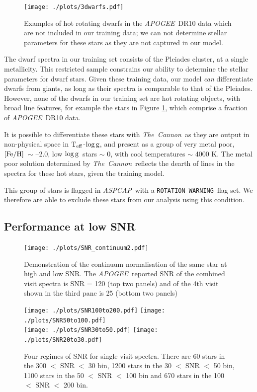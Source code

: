 \documentclass[12pt, preprint]{aastex}
\newcommand{\teff}{\mbox{$\rm T_{eff}$}}
\newcommand{\feh}{\mbox{$\rm [Fe/H]$}}
\newcommand{\logg}{\mbox{$\rm \log g$}}
\newcommand{\tc}{\textsl{The~Cannon}}
\newcommand{\apogee}{\textsl{APOGEE}}
\newcommand{\aspcap}{\textsl{ASPCAP}}
\newcommand{\rotwarn}{\texttt{ROTATION WARNING}}
\begin{document}
 
  \begin{figure}[!h]
   \centering
 \texttt{[image: ./plots/3dwarfs.pdf]}
  \caption{Examples of hot rotating dwarfs in the \apogee\ DR10 data which are not included in our training data; we can not determine stellar parameters for these stars as they are not captured in our model.}
\label{fig:dwarfs}
\end{figure}


The dwarf spectra in our training set consists of the Pleiades cluster, at a single metallicity. This restricted sample constrains our ability to determine the stellar parameters for dwarf stars. Given these training data, our model \textit{can} differentiate dwarfs from giants, as long as their spectra is comparable to that of the Pleiades. However, none of the dwarfs in our training set are hot rotating objects, with broad line features, for example the stars in Figure \ref{fig:dwarfs}, which comprise a fraction of \apogee\ DR10 data. 

It is possible to differentiate these stars with \tc\, as they are output in non-physical space in \teff-\logg, and present as a group of very metal poor, \feh\ $\sim$ --2.0, low \logg\ stars $\sim$ 0, with cool temperatures $\sim$ 4000 K. The metal poor solution determined by \tc\ reflects the dearth of lines in the spectra for these hot stars, given the training model. 

This group of stars is flagged in \aspcap\ with a \rotwarn\ flag set. We therefore are able to exclude these stars from our analysis using this condition. 
 

 


 \subsection{Performance at low SNR}
 
 \begin{figure}[!h]
  \texttt{[image: ./plots/SNR\_continuum2.pdf]}
  \caption{Demonstration of the continuum normalisation of the same star at high and low SNR. The \apogee\ reported SNR of the combined visit spectra is SNR = 120 (top two panels) and of the 4th visit shown in the third pane is 25 (bottom two panels) }
\label{fig:lowsnr}
\end{figure}

 \begin{figure}[!h]
 \centering
 \texttt{[image: ./plots/SNR100to200.pdf]}
\texttt{[image: ./plots/SNR50to100.pdf]}\\
\texttt{[image: ./plots/SNR30to50.pdf]}
\texttt{[image: ./plots/SNR20to30.pdf]}
    \caption{Four regimes of SNR for single visit spectra. There are 60 stars in the 300 $<$  SNR $<$ 30 bin, 1200 stars in the 30 $<$ SNR $<$ 50 bin, 1100 stars in the 50 $<$ SNR $<$ 100 bin and 670 stars in the 100 $<$  SNR $<$ 200 bin.}
\label{fig:SNR}
\end{figure}
\end{document}
